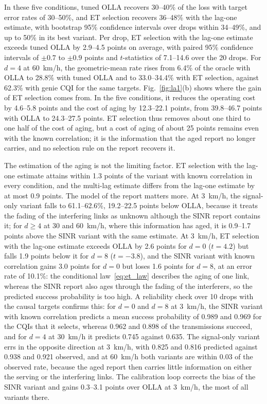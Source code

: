 \documentclass{ieeeaccess}
\begin{document}
In these five conditions, tuned OLLA recovers 30--40\% of the loss with target error rates of 30--50\%, and ET selection recovers 36--48\% with the lag-one estimate, with bootstrap 95\% confidence intervals over drops within 34--49\%, and up to 50\% in its best variant. Per drop, ET selection with the lag-one estimate exceeds tuned OLLA by 2.9--4.5 points on average, with paired 95\% confidence intervals of $\pm 0.7$ to $\pm 0.9$ points and $t$-statistics of 7.1--14.6 over the 20 drops. For $d = 4$ at 60~km/h, the geometric-mean rate rises from 6.4\% of the oracle with OLLA to 28.8\% with tuned OLLA and to 33.0--34.4\% with ET selection, against 62.3\% with genie CQI for the same targets. Fig.~\ref{fig:la1}(b) shows where the gain of ET selection comes from. In the five conditions, it reduces the operating cost by 4.6--5.8 points and the cost of aging by 12.3--22.1 points, from 39.8--46.7 points with OLLA to 24.3--27.5 points. ET selection thus removes about one third to one half of the cost of aging, but a cost of aging of about 25 points remains even with the known correlation; it is the information that the aged report no longer carries, and no selection rule on the report recovers it.

The estimation of the aging is not the limiting factor. ET selection with the lag-one estimate attains within 1.3 points of the variant with known correlation in every condition, and the multi-lag estimate differs from the lag-one estimate by at most 0.9 points. The model of the report matters more. At 3~km/h, the signal-only variant falls to 61.1--62.6\%, 19.2--22.5 points below OLLA, because it treats the fading of the interfering links as unknown although the SINR report contains it; for $d \ge 4$ at 30 and 60~km/h, where this information has aged, it is 0.9--1.7 points above the SINR variant with the same estimate. At 3~km/h, ET selection with the lag-one estimate exceeds OLLA by 2.6 points for $d = 0$ ($t = 4.2$) but falls 1.9 points below it for $d = 8$ ($t = -3.8$), and the SINR variant with known correlation gains 3.0 points for $d = 0$ but loses 1.6 points for $d = 8$, at an error rate of 10.1\%: the conditional law~\eqref{eq:et_law} describes the aging of one link, whereas the SINR report also ages through the fading of the interferers, so the predicted success probability is too high. A reliability check over 10 drops with the causal targets confirms this: for $d = 0$ and $d = 8$ at 3~km/h, the SINR variant with known correlation predicts a mean success probability of 0.989 and 0.969 for the CQIs that it selects, whereas 0.962 and 0.898 of the transmissions succeed, and for $d = 4$ at 30~km/h it predicts 0.745 against 0.635. The signal-only variant errs in the opposite direction at 3~km/h, with 0.825 and 0.816 predicted against 0.938 and 0.921 observed, and at 60~km/h both variants are within 0.03 of the observed rate, because the aged report then carries little information on either the serving or the interfering links. The calibration loop corrects the bias of the SINR variant and gains 0.3--3.1 points over OLLA at 3~km/h, the most of all variants there.
\end{document}
